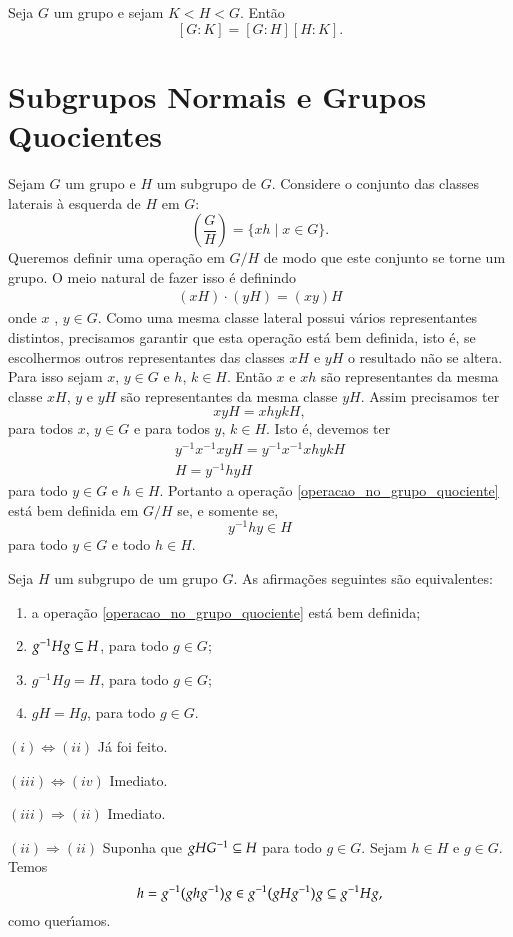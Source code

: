 \begin{proposicao}
	Seja $G$ um grupo e sejam $K < H < G$. Ent\~ao
	\[
		[G:K] = [G:H][H:K].
	\]
\end{proposicao}

\section{Subgrupos Normais e Grupos Quocientes} %
\label{sec:subgrupos_normais_e_grupos_quocientes}

Sejam $G$ um grupo e $H$ um subgrupo de $G$. Considere o conjunto das classes laterais \`a esquerda de $H$ em $G$:
\[
	\left(\dfrac{G}{H}\right) = \{xh \mid x \in G\}.
\]
Queremos definir uma opera\c{c}\~ao em $G/H$ de modo que este conjunto se torne um grupo. O meio natural de fazer isso \'e definindo
\begin{align}\label{operacao_no_grupo_quociente}
	(xH)\cdot (yH) = (xy)H
\end{align}
onde $x$ , $y \in G$. Como uma mesma classe lateral possui v\'arios representantes distintos, precisamos garantir que esta opera\c{c}\~ao est\'a bem definida, isto \'e, se escolhermos outros representantes das classes $xH$ e $yH$ o resultado n\~ao se altera. Para isso sejam $x$, $y \in G$ e $h$, $k \in H$. Ent\~ao $x$ e $xh$ s\~ao representantes da mesma classe $xH$, $y$ e $yH$ s\~ao representantes da mesma classe $yH$. Assim precisamos ter
\[
	xyH = xhykH,
\]
para todos $x$, $y \in G$ e para todos $y$, $k \in H$. Isto \'e, devemos ter
\begin{align*}
	y^{-1}x^{-1}xyH = y^{-1}x^{-1}xhykH\\
	H = y^{-1}hyH
\end{align*}
para todo $y \in G$ e $h \in H$. Portanto a opera\c{c}\~ao \eqref{operacao_no_grupo_quociente} est\'a bem definida em $G/H$ se, e somente se,
\[
	y^{-1}hy \in H
\]
para todo $y \in G$ e todo $h \in H$.

\begin{proposicao}\label{condicoes_subgrupo_normal}
	Seja $H$ um subgrupo de um grupo $G$. As afirma\c{c}\~oes seguintes s\~ao equivalentes:
	\begin{enumerate}[label=({\roman*})]
		\item a opera\c{c}\~ao \eqref{operacao_no_grupo_quociente} est\'a bem definida;
		\item $g^{-1}Hg \subseteq H$, para todo $g \in G$;
		\item $g^{-1}Hg = H$, para todo $g \in G$;
		\item $gH = Hg$, para todo $g \in G$.
	\end{enumerate}
\end{proposicao}
\begin{prova}
	$(i) \Leftrightarrow (ii)$ J\'a foi feito.

	$(iii) \Leftrightarrow (iv)$ Imediato.

	$(iii) \Rightarrow (ii)$ Imediato.

	$(ii) \Rightarrow (ii)$ Suponha que $gHG^{-1} \subseteq H$ para todo $g \in G$. Sejam $h \in H$ e $g \in G$. Temos
	\[
		h = g^{-1}(ghg^{-1})g \in g^{-1}(gHg^{-1})g \subseteq g^{-1}Hg,
	\]
	como quer{\'\i}amos.
\end{prova}

